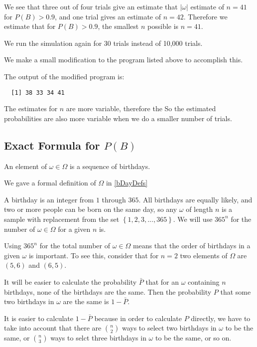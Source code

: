 \documentclass[a4paper,11pt]{article}
\begin{document}
We see that three out of four trials give an estimate that
$\left| \omega \right|$ estimate of $n=41$ for $P\left(B \right) > 0.9$,
and one trial gives an estimate of $n=42$.  Therefore we estimate that
for $P\left(B \right) > 0.9$, the smallest $n$ possible is $n=41$.

We run the simulation again for 30 trials instead of 10,000 trials.

We make a small modification to the program listed above to accomplish
this.

The output of the modified program is:

\begin{lstlisting}
  [1] 38 33 34 41
\end{lstlisting}

The estimates for $n$ are more variable, therefore the So the estimated 
probabilities are also more variable when we do a smaller number of
trials.

\subsection{Exact Formula for $P \left( B \right)$}

An element of $\omega \in \Omega$ is a sequence of birthdays.  

We gave a formal definition of $\Omega$ in \ref{bDayDefs}

A birthday is an integer from $1$ through $365$. 
All birthdays are equally likely, and two or more people can be born on
the same day, so any $\omega$ of length $n$ is a sample with replacement
from the set $\left\{ 1, 2, 3, ..., 365 \right\}$. We will use
$365^{n}$ for the number of $\omega \in \Omega$ for a given $n$ is.

Using $365^{n}$ for the total number of $\omega \in \Omega$ means
that the order of birthdays in a given $\omega$ is important.
To see this, consider that for $n=2$ two elements of $\Omega$ are
$\left( 5, 6 \right)$ and $\left(6, 5\right)$.

It will be easier to calculate the probability $\bar{P}$ that for an
$\omega$ containing $n$ birthdays, none of the birthdays are the same.
Then the probability $P$ that some two birthdays in $\omega$ are the
same  is $1-\bar{P}$.

It is easier to calculate $1-\bar{P}$ because in order to calculate $P$
directly, we have to take into account that there are $\binom{n}{2}$
ways to select two birthdays in $\omega$ to be the same, or 
$\binom{n}{3}$ ways to selct three birthdays in $\omega$ to be the same,
or so on.
\end{document}
